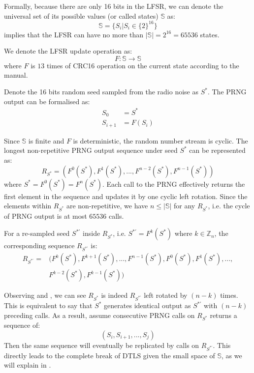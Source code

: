Formally, because there are only 16 bits in the LFSR, we can denote the universal set of its  possible values (or called states) $\mathbb{S}$ as:
\begin{equation} \label{PRNGState}
\mathbb{S} = \{ S_{i} | S_{i} \in \{2\}^{16}\}
\end{equation}
 implies that the LFSR can have no more than $|\mathbb{S}| = 2^{16} = 65536$ states.

We denote the LFSR update operation as:
\begin{equation}
F:\mathbb{S} \rightarrow \mathbb{S}
\end{equation}
where $F$ is $13$ times of CRC16 operation on the current state according to the manual.

Denote the 16 bits random seed sampled from the radio noise as $S^*$. The PRNG output can be formalised as:
\begin{equation}
	\begin{aligned}
	S_{0} &= S^* \\
	S_{i+1} &= F(S_{i})
	\end{aligned}
\end{equation}

Since $\mathbb{S}$ is finite and $F$ is deterministic, the random number stream is cyclic. The longest non-repetitive PRNG output sequence under seed $S^*$ can be represented as:
\begin{equation} \label{R*}
R_{S^*}= (F^0(S^{*}), F^{1}(S^{*}), ..., F^{n-2}(S^{*}), F^{n-1}(S^{*}))
\end{equation}
where $S^{*} = F^{0}(S^{*}) = F^{n}(S^{*})$. Each call to the PRNG effectively returns the first element in the sequence and updates it by one cyclic left rotation. Since the elements within $R_{S^*}$ are non-repetitive, we have $n \leq |\mathbb{S}|$ for any $R_{S^*}$, i.e. the cycle of PRNG output is at most $65536$ calls.

For a re-sampled seed $S^{*'}$ inside $R_{S^*}$, i.e. $S^{*'} = F^{k}(S^*)$ where $k \in \mathbb{Z}_n$, the corresponding sequence $R_{S^{*'}}$ is:
\begin{equation}\label{R*'}
	\begin{aligned}
	R_{S^{*'}} = &( F^{k}(S^*), F^{k+1}(S^{*}), ..., F^{n-1}(S^*), F^{0}(S^*), F^{1}(S^*),...,\\
	&F^{k-2}(S^{*}), F^{k-1}(S^{*}))
	\end{aligned}
\end{equation}

Observing  and , we can see $R_{S^*}$ is indeed $R_{S^{*'}}$ left rotated by $(n-k)$ times. This is equivalent to say that ${S^*}$ generates identical output as ${S^{*'}}$ with $(n-k)$ preceding calls. As a result, assume consecutive PRNG calls on $R_{S^*}$ returns a sequence of:
\begin{equation*}
(S_i, S_{i+1}, ..., S_{j})
\end{equation*}
Then the same sequence will eventually be replicated by calls on $R_{S^{*'}}$. This directly leads to the complete break of DTLS given the small space of $\mathbb{S}$, as we will explain in .

